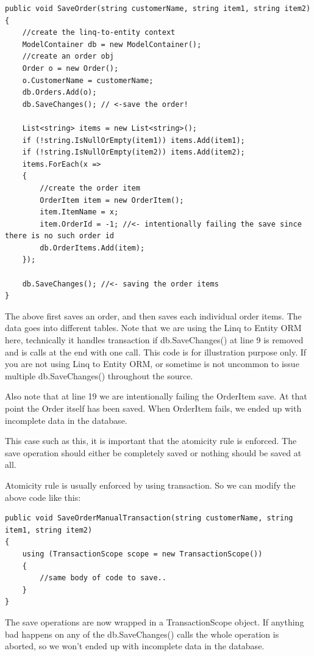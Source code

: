 \begin{lstlisting}[caption={SaveOrder Example}, label=transactionex, frame=tb, basicstyle=\scriptsize]
public void SaveOrder(string customerName, string item1, string item2)
{
	//create the linq-to-entity context
	ModelContainer db = new ModelContainer();
	//create an order obj
	Order o = new Order();
	o.CustomerName = customerName;
	db.Orders.Add(o);
	db.SaveChanges(); // <-save the order!

	List<string> items = new List<string>();
	if (!string.IsNullOrEmpty(item1)) items.Add(item1);
	if (!string.IsNullOrEmpty(item2)) items.Add(item2);
	items.ForEach(x =>
	{
		//create the order item
		OrderItem item = new OrderItem();
		item.ItemName = x;
		item.OrderId = -1; //<- intentionally failing the save since there is no such order id
		db.OrderItems.Add(item);
	});

	db.SaveChanges(); //<- saving the order items
}
\end{lstlisting}

The above first saves an order, and then saves each individual order items. The data goes into different tables. Note that we are using the Linq to Entity ORM here, technically it handles transaction if db.SaveChanges() at line 9 is removed and is calls at the end with one call. This code is for illustration purpose only. If you are not using Linq to Entity ORM, or sometime is not uncommon to issue multiple db.SaveChanges() throughout the source.

Also note that at line 19 we are intentionally failing the OrderItem save. At that point the Order itself has been saved. When OrderItem fails, we ended up with incomplete data in the database.

This case such as this, it is important that the atomicity rule is enforced. The save operation should either be completely saved or nothing should be saved at all. 

Atomicity rule is usually enforced by using transaction. So we can modify the above code like this:

\begin{lstlisting}[caption={SaveOrderManualTransaction Example}, label=manualtrans, frame=tb, basicstyle=\scriptsize]
public void SaveOrderManualTransaction(string customerName, string item1, string item2)
{
	using (TransactionScope scope = new TransactionScope())
	{
		//same body of code to save..
	}
}
\end{lstlisting}

The save operations are now wrapped in a TransactionScope object. If anything bad happens on any of the db.SaveChanges() calls the whole operation is aborted, so we won’t ended up with incomplete data in the database.


